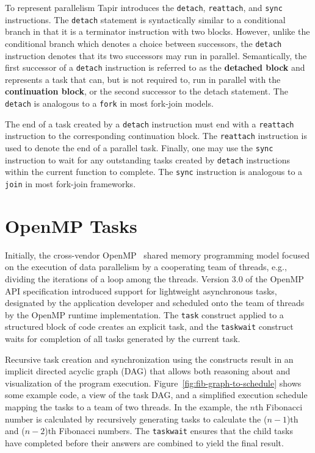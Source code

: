\documentclass[sigconf]{acmart}
\newcommand{\figref}[1]         {Figure~\ref{fig:#1}}
\def\code{\lstinline[basicstyle=\ttfamily\color{CodeColor}]}
\begin{document}
To represent parallelism Tapir introduces the \code{detach}, \code{reattach}, and
\code{sync} instructions. The \code{detach} statement is syntactically similar to
a conditional branch in that it is a terminator instruction with two blocks.
However, unlike the conditional branch which denotes a choice between successors, the \code{detach} instruction denotes that its two successors may run in parallel. Semantically,
the first successor of a \code{detach} instruction is referred to as the \textbf{detached block} and represents a task that can, but is not required to, run in parallel with the
\textbf{continuation block}, or the second successor to the detach statement. The \code{detach}
is analogous to a \code{fork} in most fork-join models.

The end of a task created by a \code{detach} instruction must end with a \code{reattach} instruction to the corresponding continuation block. The \code{reattach} instruction
is used to denote the end of a parallel task.
%
Finally, one may use the \code{sync} instruction to wait for any outstanding tasks created
by \code{detach} instructions within the current function to complete. The \code{sync}
instruction is analogous to a \code{join} in most fork-join frameworks.


\section{OpenMP Tasks} \label{Sec:OpenMP}

Initially, the cross-vendor OpenMP~\cite{openmp} shared memory programming model
focused on the execution of data parallelism by a cooperating team of threads,
e.g., dividing the iterations of a loop among the threads. Version 3.0 of the
OpenMP API specification introduced support for lightweight asynchronous tasks,
designated by the application developer and scheduled onto the team of threads
by the OpenMP runtime implementation.  The \texttt{task} construct applied to
a structured block of code creates an explicit task, and the \texttt{taskwait}
construct waits for completion of all tasks generated by the current task.

Recursive task creation and synchronization using the constructs result in 
an implicit directed acyclic graph (DAG) that allows both reasoning about and 
visualization of the program execution.  \figref{fib-graph-to-schedule}
shows some example code, a view of the task DAG, and a simplified execution 
schedule mapping the tasks to a team of two threads.  In the example, the $n$th 
Fibonacci number is calculated by recursively generating tasks to calculate 
the ($n-1$)th and ($n-2$)th Fibonacci numbers.  The \texttt{taskwait} ensures that 
the child tasks have completed before their answers are combined to yield the 
final result.
\end{document}
